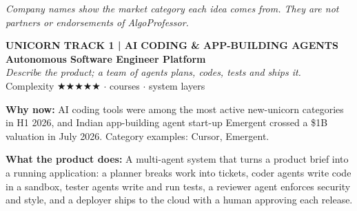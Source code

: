 \documentclass[10pt,a4paper]{article}
\begin{document}
{\footnotesize\itshape\color{muted}Company names show the market category each idea comes from. They are not partners or endorsements of AlgoProfessor.}
\newpage
\begin{tcolorbox}[colback=navy,colframe=navy,arc=2pt,left=8pt,top=5pt,bottom=5pt]{\small\bfseries\color{goldl}UNICORN TRACK 1 \;|\; AI CODING \& APP-BUILDING AGENTS}\\[1pt]{\LARGE\bfseries\color{white}Autonomous Software Engineer Platform}\\[2pt]{\small\itshape\color{goldl}Describe the product; a team of agents plans, codes, tests and ships it.}\\[2pt]{\small\color{white}Complexity {\color{goldl}★★★★★} \;$\cdot$ courses \;$\cdot$ system layers}\end{tcolorbox}
\begin{tcolorbox}[colback=l1bg,colframe=l1bg,arc=2pt,borderline west={3pt}{0pt}{saffron},top=2pt,bottom=2pt]\small\textbf{Why now:} AI coding tools were among the most active new-unicorn categories in H1 2026, and Indian app-building agent start-up Emergent crossed a \$1B valuation in July 2026. {\color{muted}Category examples: Cursor, Emergent.}\end{tcolorbox}
\begin{tcolorbox}[colback=l3bg,colframe=l3bg,arc=2pt,borderline west={3pt}{0pt}{igreen},top=2pt,bottom=2pt]\small\textbf{What the product does:} A multi-agent system that turns a product brief into a running application: a planner breaks work into tickets, coder agents write code in a sandbox, tester agents write and run tests, a reviewer agent enforces security and style, and a deployer ships to the cloud with a human approving each release.\end{tcolorbox}
\end{document}
